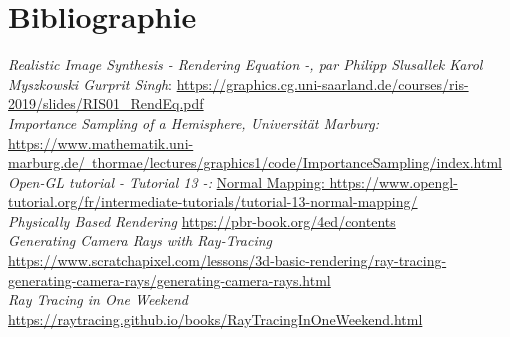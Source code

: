 \section{Bibliographie}

\textit{Realistic Image Synthesis - Rendering Equation -, par Philipp Slusallek Karol Myszkowski Gurprit Singh}: \href{https://graphics.cg.uni-saarland.de/courses/ris-2019/slides/RIS01_RendEq.pdf}{https://graphics.cg.uni-saarland.de/courses/ris-2019/slides/RIS01\_RendEq.pdf}\\

\textit{Importance Sampling of a Hemisphere, Universität Marburg:} \href{https://www.mathematik.uni-marburg.de/thormae/lectures/graphics1/code/ImportanceSampling/index.html}{https://www.mathematik.uni-marburg.de/~thormae/lectures/graphics1/code/ImportanceSampling/index.html}\\

\textit{Open-GL tutorial - Tutorial 13 -:} \href{Normal Mapping: https://www.opengl-tutorial.org/fr/intermediate-tutorials/tutorial-13-normal-mapping/}{Normal Mapping: https://www.opengl-tutorial.org/fr/intermediate-tutorials/tutorial-13-normal-mapping/}\\

\textit{Physically Based Rendering} \href{https://pbr-book.org/4ed/contents}{https://pbr-book.org/4ed/contents}\\

\textit{Generating Camera Rays with Ray-Tracing} \href{https://www.scratchapixel.com/lessons/3d-basic-rendering/ray-tracing-generating-camera-rays/generating-camera-rays.html}{https://www.scratchapixel.com/lessons/3d-basic-rendering/ray-tracing-generating-camera-rays/generating-camera-rays.html}\\

\textit{Ray Tracing in One Weekend} \href{https://raytracing.github.io/books/RayTracingInOneWeekend.html}{https://raytracing.github.io/books/RayTracingInOneWeekend.html}\\
